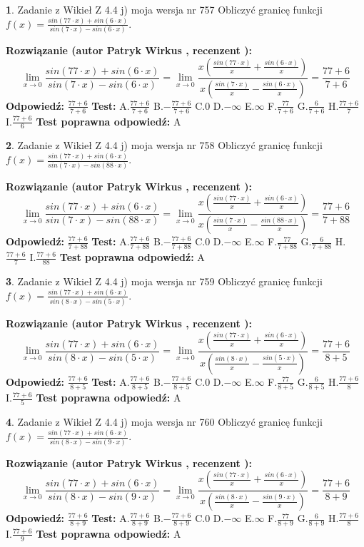 \documentclass[12pt, a4paper]{article}
\theoremstyle{definition} %
\newtheorem{zad}{}
\newcommand{\zadStart}[1]{\begin{zad}#1\newline}
\newcommand{\zadStop}{\end{zad}}
\newcommand{\rozwStart}[2]{\noindent \textbf{Rozwiązanie (autor #1 , recenzent #2): }\newline}
\newcommand{\rozwStop}{\newline}
\newcommand{\odpStart}{\noindent \textbf{Odpowiedź:}\newline}
\newcommand{\odpStop}{\newline}
\newcommand{\testStart}{\noindent \textbf{Test:}\newline}
\newcommand{\testStop}{\newline}
\newcommand{\kluczStart}{\noindent \textbf{Test poprawna odpowiedź:}\newline}
\newcommand{\kluczStop}{\newline}
\begin{document}
\zadStart{Zadanie z Wikieł Z 4.4 j) moja wersja nr 757}
Obliczyć granicę funkcji $f(x)=\frac{sin(77\cdot x) +sin(6\cdot x)}{sin(7\cdot x) -sin(6\cdot x)}$.
\zadStop
\rozwStart{Patryk Wirkus}{}
$$\lim\limits_{x\to 0}\frac{sin(77\cdot x) +sin(6\cdot x)}{sin(7\cdot x) -sin(6\cdot x)}=\lim\limits_{x\to 0}\frac{x(\frac{sin(77\cdot x)}{x}+\frac{sin(6\cdot x)}{x})}{x(\frac{sin(7\cdot x)}{x}-\frac{sin(6\cdot x)}{x})}=\frac{77+6}{7+6}$$
\rozwStop
\odpStart
$\frac{77+6}{7+6}$
\odpStop
\testStart
A.$\frac{77+6}{7+6}$
B.$-\frac{77+6}{7+6}$
C.$0$
D.$-\infty$
E.$\infty$
F.$\frac{77}{7+6}$
G.$\frac{6}{7+6}$
H.$\frac{77+6}{7}$
I.$\frac{77+6}{6}$
\testStop
\kluczStart
A
\kluczStop



\zadStart{Zadanie z Wikieł Z 4.4 j) moja wersja nr 758}
Obliczyć granicę funkcji $f(x)=\frac{sin(77\cdot x) +sin(6\cdot x)}{sin(7\cdot x) -sin(88\cdot x)}$.
\zadStop
\rozwStart{Patryk Wirkus}{}
$$\lim\limits_{x\to 0}\frac{sin(77\cdot x) +sin(6\cdot x)}{sin(7\cdot x) -sin(88\cdot x)}=\lim\limits_{x\to 0}\frac{x(\frac{sin(77\cdot x)}{x}+\frac{sin(6\cdot x)}{x})}{x(\frac{sin(7\cdot x)}{x}-\frac{sin(88\cdot x)}{x})}=\frac{77+6}{7+88}$$
\rozwStop
\odpStart
$\frac{77+6}{7+88}$
\odpStop
\testStart
A.$\frac{77+6}{7+88}$
B.$-\frac{77+6}{7+88}$
C.$0$
D.$-\infty$
E.$\infty$
F.$\frac{77}{7+88}$
G.$\frac{6}{7+88}$
H.$\frac{77+6}{7}$
I.$\frac{77+6}{88}$
\testStop
\kluczStart
A
\kluczStop



\zadStart{Zadanie z Wikieł Z 4.4 j) moja wersja nr 759}
Obliczyć granicę funkcji $f(x)=\frac{sin(77\cdot x) +sin(6\cdot x)}{sin(8\cdot x) -sin(5\cdot x)}$.
\zadStop
\rozwStart{Patryk Wirkus}{}
$$\lim\limits_{x\to 0}\frac{sin(77\cdot x) +sin(6\cdot x)}{sin(8\cdot x) -sin(5\cdot x)}=\lim\limits_{x\to 0}\frac{x(\frac{sin(77\cdot x)}{x}+\frac{sin(6\cdot x)}{x})}{x(\frac{sin(8\cdot x)}{x}-\frac{sin(5\cdot x)}{x})}=\frac{77+6}{8+5}$$
\rozwStop
\odpStart
$\frac{77+6}{8+5}$
\odpStop
\testStart
A.$\frac{77+6}{8+5}$
B.$-\frac{77+6}{8+5}$
C.$0$
D.$-\infty$
E.$\infty$
F.$\frac{77}{8+5}$
G.$\frac{6}{8+5}$
H.$\frac{77+6}{8}$
I.$\frac{77+6}{5}$
\testStop
\kluczStart
A
\kluczStop



\zadStart{Zadanie z Wikieł Z 4.4 j) moja wersja nr 760}
Obliczyć granicę funkcji $f(x)=\frac{sin(77\cdot x) +sin(6\cdot x)}{sin(8\cdot x) -sin(9\cdot x)}$.
\zadStop
\rozwStart{Patryk Wirkus}{}
$$\lim\limits_{x\to 0}\frac{sin(77\cdot x) +sin(6\cdot x)}{sin(8\cdot x) -sin(9\cdot x)}=\lim\limits_{x\to 0}\frac{x(\frac{sin(77\cdot x)}{x}+\frac{sin(6\cdot x)}{x})}{x(\frac{sin(8\cdot x)}{x}-\frac{sin(9\cdot x)}{x})}=\frac{77+6}{8+9}$$
\rozwStop
\odpStart
$\frac{77+6}{8+9}$
\odpStop
\testStart
A.$\frac{77+6}{8+9}$
B.$-\frac{77+6}{8+9}$
C.$0$
D.$-\infty$
E.$\infty$
F.$\frac{77}{8+9}$
G.$\frac{6}{8+9}$
H.$\frac{77+6}{8}$
I.$\frac{77+6}{9}$
\testStop
\kluczStart
A
\kluczStop
\end{document}
